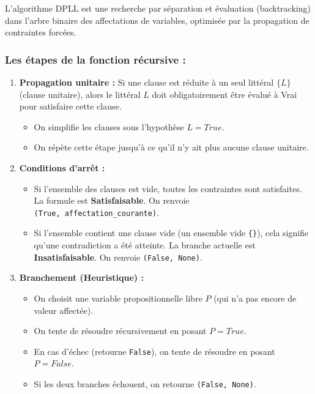 \documentclass[11pt,a4paper]{article}
\begin{document}
L'algorithme DPLL est une recherche par séparation et évaluation
(backtracking) dans l'arbre binaire des affectations de variables,
optimisée par la propagation de contraintes forcées.

\hypertarget{les-uxe9tapes-de-la-fonction-ruxe9cursive}{%
\subsubsection{Les étapes de la fonction récursive
:}\label{les-uxe9tapes-de-la-fonction-ruxe9cursive}}

\begin{enumerate}
\def\labelenumi{\arabic{enumi}.}
\tightlist
\item
  \textbf{Propagation unitaire :} Si une clause est réduite à un seul
  littéral \(\{L\}\) (clause unitaire), alors le littéral \(L\) doit
  obligatoirement être évalué à Vrai pour satisfaire cette clause.

  \begin{itemize}
  \tightlist
  \item
    On simplifie les clauses sous l'hypothèse \(L = True\).
  \item
    On répète cette étape jusqu'à ce qu'il n'y ait plus aucune clause
    unitaire.
  \end{itemize}
\item
  \textbf{Conditions d'arrêt :}

  \begin{itemize}
  \tightlist
  \item
    Si l'ensemble des clauses est vide, toutes les contraintes sont
    satisfaites. La formule est \textbf{Satisfaisable}. On renvoie
    \texttt{(True,\ affectation\_courante)}.
  \item
    Si l'ensemble contient une clause vide (un ensemble vide
    \texttt{\{\}}), cela signifie qu'une contradiction a été atteinte.
    La branche actuelle est \textbf{Insatisfaisable}. On renvoie
    \texttt{(False,\ None)}.
  \end{itemize}
\item
  \textbf{Branchement (Heuristique) :}

  \begin{itemize}
  \tightlist
  \item
    On choisit une variable propositionnelle libre \(P\) (qui n'a pas
    encore de valeur affectée).
  \item
    On tente de résoudre récursivement en posant \(P = True\).
  \item
    En cas d'échec (retourne \texttt{False}), on tente de résoudre en
    posant \(P = False\).
  \item
    Si les deux branches échouent, on retourne \texttt{(False,\ None)}.
  \end{itemize}
\end{enumerate}
\end{document}
